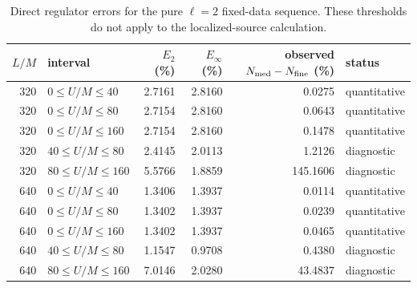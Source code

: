 \begin{table}
\centering
\small
\caption{Direct regulator errors for the pure $\ell=2$ fixed-data sequence. These thresholds do not apply to the localized-source calculation.}
\label{tab:flat-regulator-windows}
\begin{tabular}{rlrrrl}
\toprule
$L/M$ & interval & $E_2$ (\%) & $E_\infty$ (\%) & observed $N_{\rm med}-N_{\rm fine}$ (\%) & status \\
\midrule
320 & $0\leq U/M\leq 40$ & 2.7161 & 2.8160 & 0.0275 & quantitative \\
320 & $0\leq U/M\leq 80$ & 2.7154 & 2.8160 & 0.0643 & quantitative \\
320 & $0\leq U/M\leq 160$ & 2.7154 & 2.8160 & 0.1478 & quantitative \\
320 & $40\leq U/M\leq 80$ & 2.4145 & 2.0113 & 1.2126 & diagnostic \\
320 & $80\leq U/M\leq 160$ & 5.5766 & 1.8859 & 145.1606 & diagnostic \\
640 & $0\leq U/M\leq 40$ & 1.3406 & 1.3937 & 0.0114 & quantitative \\
640 & $0\leq U/M\leq 80$ & 1.3402 & 1.3937 & 0.0239 & quantitative \\
640 & $0\leq U/M\leq 160$ & 1.3402 & 1.3937 & 0.0465 & quantitative \\
640 & $40\leq U/M\leq 80$ & 1.1547 & 0.9708 & 0.4380 & diagnostic \\
640 & $80\leq U/M\leq 160$ & 7.0146 & 2.0280 & 43.4837 & diagnostic \\
\bottomrule
\end{tabular}
\end{table}
